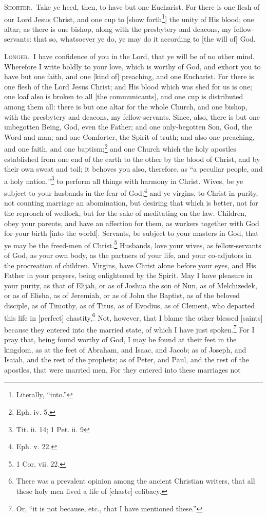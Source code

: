
\textsc{Shorter.}~Take ye heed, then, to have but one Eucharist. For there is one flesh of our Lord Jesus Christ, and one cup to [show forth\footnote{Literally, “into.”}] the unity of His blood; one altar; as there is one bishop, along with the presbytery and deacons, my fellow-servants: that so, whatsoever ye do, ye may do it according to [the will of] God.

\textsc{Longer.}~I have confidence of you in the Lord, that ye will be of no other mind. Wherefore I write boldly to your love, which is worthy of God, and exhort you to have but one faith, and one [kind of] preaching, and one Eucharist. For there is one flesh of the Lord Jesus Christ; and His blood which was shed for us is one; one loaf also is broken to all [the communicants], and one cup is distributed among them all: there is but one altar for the whole Church, and one bishop, with the presbytery and deacons, my fellow-servants. Since, also, there is but one unbegotten Being, God, even the Father; and one only-begotten Son, God, the Word and man; and one Comforter, the Spirit of truth; and also one preaching, and one faith, and one baptism;\footnote{Eph. iv. 5.} and one Church which the holy apostles established from one end of the earth to the other by the blood of Christ, and by their own sweat and toil; it behoves you also, therefore, as “a peculiar people, and a holy nation,”\footnote{Tit. ii. 14; 1 Pet. ii. 9} to perform all things with harmony in Christ. Wives, be ye subject to your husbands in the fear of God;\footnote{Eph. v. 22.} and ye virgins, to Christ in purity, not counting marriage an abomination, but desiring that which is better, not for the reproach of wedlock, but for the sake of meditating on the law. Children, obey your parents, and have an affection for them, as workers together with God for your birth [into the world]. Servants, be subject to your masters in God, that ye may be the freed-men of Christ.\footnote{1 Cor. vii. 22.} Husbands, love your wives, as fellow-servants of God, as your own body, as the partners of your life, and your co-adjutors in the procreation of children. Virgins, have Christ alone before your eyes, and His Father in your prayers, being enlightened by the Spirit. May I have pleasure in your purity, as that of Elijah, or as of Joshua the son of Nun, as of Melchizedek, or as of Elisha, as of Jeremiah, or as of John the Baptist, as of the beloved disciple, as of Timothy, as of Titus, as of Evodius, as of Clement, who departed this life in [perfect] chastity,\footnote{There was a prevalent opinion among the ancient Christian writers, that all these holy men lived a life of [chaste] celibacy.} Not, however, that I blame the other blessed [saints] because they entered into the married state, of which I have just spoken.\footnote{Or, “it is not because, etc., that I have mentioned these.”} For I pray that, being found worthy of God, I may be found at their feet in the kingdom, as at the feet of Abraham, and Isaac, and Jacob; as of Joseph, and Isaiah, and the rest of the prophets; as of Peter, and Paul, and the rest of the apostles, that were married men. For they entered into these marriages not 